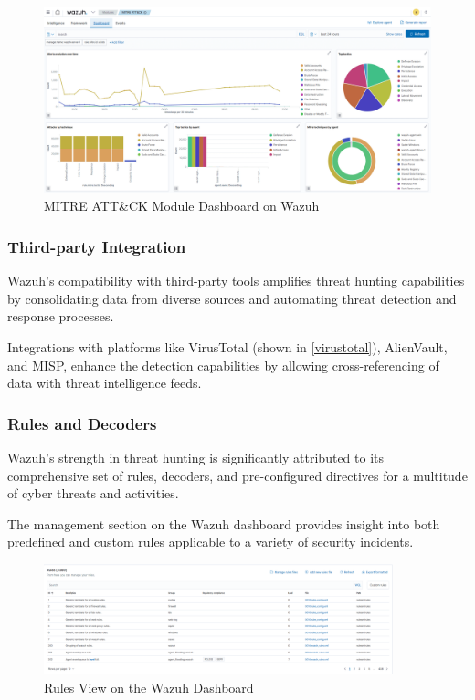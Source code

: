 \begin{figure}[H]
    \centering
    \includegraphics[width=\textwidth]{images/threat-hunting/mitre-dashboard.png}
    \caption{MITRE ATT\&CK Module Dashboard on Wazuh}
    \label{fig:mitre-attack-dashboard}
\end{figure}

\subsubsection{Third-party Integration}

Wazuh's compatibility with third-party tools amplifies threat hunting capabilities by consolidating data from diverse sources and automating threat detection and response processes.

Integrations with platforms like VirusTotal (shown in \ref{virustotal}), AlienVault, and MISP, enhance the detection capabilities by allowing cross-referencing of data with threat intelligence feeds.

\subsubsection{Rules and Decoders}

Wazuh's strength in threat hunting is significantly attributed to its comprehensive set of rules, decoders, and pre-configured directives for a multitude of cyber threats and activities.

The management section on the Wazuh dashboard provides insight into both predefined and custom rules applicable to a variety of security incidents.

\begin{figure}[H]
    \centering
    \includegraphics[width=0.9\textwidth]{images/threat-hunting/rules.png}
    \caption{Rules View on the Wazuh Dashboard}
    \label{fig:wazuh-dashboard-rules}
\end{figure}

